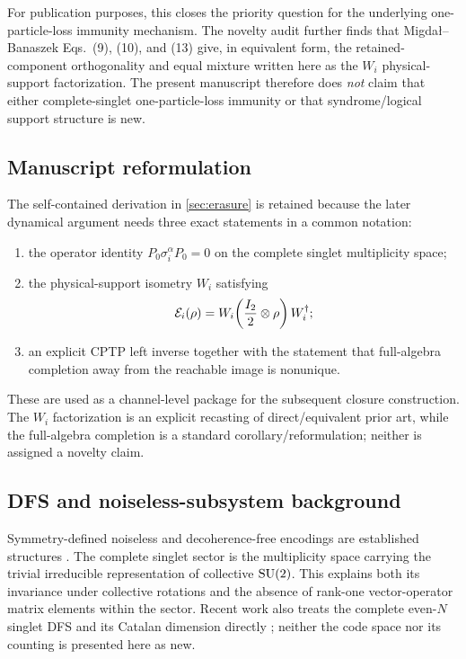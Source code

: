 For publication purposes, this closes the priority question for the underlying one-particle-loss immunity mechanism.  The novelty audit further finds that Migda\l{}--Banaszek Eqs.~(9), (10), and (13) give, in equivalent form, the retained-component orthogonality and equal mixture written here as the $W_i$ physical-support factorization.  The present manuscript therefore does \emph{not} claim that either complete-singlet one-particle-loss immunity or that syndrome/logical support structure is new.

\subsection{Manuscript reformulation}

The self-contained derivation in \cref{sec:erasure} is retained because the later dynamical argument needs three exact statements in a common notation:
\begin{enumerate}[label=(\roman*)]
  \item the operator identity $P_0\sigma_i^\alpha P_0=0$ on the complete singlet multiplicity space;
  \item the physical-support isometry $W_i$ satisfying
  \begin{equation}
    \mathcal E_i(\rho)=W_i\!\left(\frac{I_2}{2}\otimes\rho\right)W_i^\dagger;
  \end{equation}
  \item an explicit CPTP left inverse together with the statement that full-algebra completion away from the reachable image is nonunique.
\end{enumerate}
These are used as a channel-level package for the subsequent closure construction.  The $W_i$ factorization is an explicit recasting of direct/equivalent prior art, while the full-algebra completion is a standard corollary/reformulation; neither is assigned a novelty claim.

\subsection{DFS and noiseless-subsystem background}

Symmetry-defined noiseless and decoherence-free encodings are established structures \cite{ZanardiRasetti1997,LidarBaconWhaley1999,BaconKempeLidarWhaley2000}.  The complete singlet sector is the multiplicity space carrying the trivial irreducible representation of collective $\mathrm{SU}(2)$.  This explains both its invariance under collective rotations and the absence of rank-one vector-operator matrix elements within the sector.  Recent work also treats the complete even-$N$ singlet DFS and its Catalan dimension directly \cite{LiLiu2026}; neither the code space nor its counting is presented here as new.

